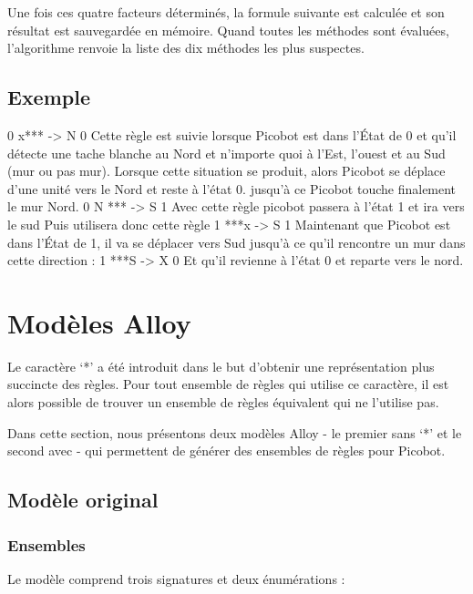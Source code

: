 \documentclass{article}
\begin{document}
Une fois ces quatre facteurs déterminés, la formule suivante est
calculée et son résultat est sauvegardée en
mémoire. Quand toutes les méthodes sont évaluées, l'algorithme renvoie
la liste des dix méthodes les plus suspectes.

\newpage
\subsection{Exemple}

0 x*** -> N 0
Cette règle est suivie lorsque Picobot est dans l'État de 0 et qu'il détecte une tache blanche au Nord et n'importe quoi à l'Est, l'ouest et au Sud (mur ou pas mur).
Lorsque cette situation se produit, alors Picobot se déplace d'une unité vers le Nord et reste à l'état 0.
jusqu'à ce Picobot touche finalement le mur Nord.
0 N *** -> S 1
Avec cette règle picobot passera à l'état 1 et ira vers le sud
Puis utilisera donc cette règle
1 ***x -> S 1
Maintenant que Picobot est dans l'État de 1, il va se déplacer vers Sud jusqu'à ce qu'il rencontre un mur dans cette direction :
1 ***S -> X 0
Et qu'il revienne à l'état 0 et reparte vers le nord.

\section{Modèles Alloy}
Le caractère ‘*’ a été introduit dans le but d’obtenir une représentation plus succincte des règles. Pour tout ensemble de règles qui utilise ce caractère, il est alors possible de trouver un ensemble de règles équivalent qui ne l’utilise pas.

Dans cette section, nous présentons deux modèles Alloy - le premier sans ‘*’ et le second avec - qui permettent de générer des ensembles de règles pour Picobot.

\subsection{Modèle original}
\subsubsection{Ensembles}
Le modèle comprend trois signatures et deux énumérations :
\\
\end{document}
